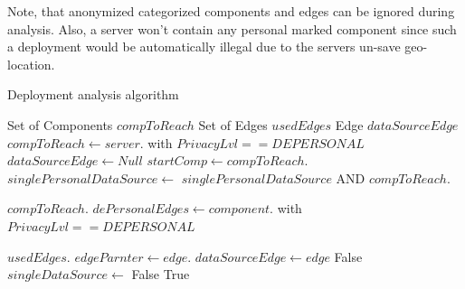 Note, that anonymized categorized components and edges can be ignored during analysis. Also, a server won't contain any personal marked component since such a deployment would be automatically illegal due to the servers un-save geo-location.


\begin{algorithm}[h]
	\caption{Deployment analysis algorithm}
	\label{algo:deployment_analysis}
	\begin{algorithmic}[1]
		
		\State Set of Components $compToReach$
		\State Set of Edges $usedEdges$
		\State Edge $dataSourceEdge$
		\State
			\State $compToReach\gets server.$ with $PrivacyLvl == DEPERSONAL$
			\State $dataSourceEdge \gets Null$
			\State $startComp\gets compToReach.$
			\State $singlePersonalDataSource\gets $
			\State \Return $singlePersonalDataSource$ AND $compToReach.$ 
		\EndProcedure \State
		
		
		\State $compToReach.$ 
		\State $dePersonalEdges\gets component.$ with $PrivacyLvl == DEPERSONAL$\State
		
				\State {}
			\Else 
				\State $usedEdges.$ 
				\State $edgeParnter\gets edge.$ 
				\State
					 	\State $dataSourceEdge \gets edge$
				 	\Else 
					 	\State \Return False
				 	\EndIf
				\Else \State
					$singleDataSource\gets$ 
						\State \Return False
					\EndIf
				\EndIf 
			\EndIf
		\EndFor 
		\State \Return True
		\EndFunction
	\end{algorithmic}
\end{algorithm}


